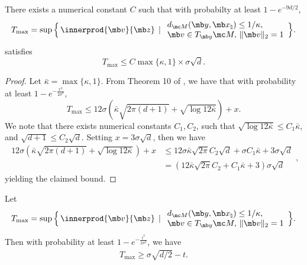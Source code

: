 




{
\begin{lemma}\label{lem:upper bound for Tmax} There exists a numerical constant $C$ such that with probabilty at least $1 - e^{-9d/2}$, 
    \begin{equation}
    T_{\max} = \sup \, \Bigl\{ \, \innerprod{ \mb v }{\mb z } \, \mid  \begin{array}{l} d_{\mc M}(\mb y, \mb x_\natural) \le 1/\kappa, \\ \mb v \in T_{\mb y} \mc M, \, \| \mb v \|_2 = 1 \end{array} \Bigr\}. 
\end{equation}
satisfies 
\begin{equation}
    T_{\max} 
    \leq C \max\{ \kappa, 1 \} \times \sigma \sqrt{d}.
\end{equation}
\end{lemma}

\begin{proof}
Let $\bar{\kappa} = \max \{ \kappa, 1 \}$. From Theorem 10 of \cite{yan2023tpopt}, we have that  with probability at least $1-e^{-\frac{x^{2}}{2\sigma^{2}}}$,  
\begin{equation}
    T_{\max} \le 12\sigma\left(\bar{\kappa} \sqrt{2\pi(d+1)}+\sqrt{\log12\bar{\kappa}}\right)+x. 
\end{equation}
We note that there exists numerical constants $C_1, C_2$, such that $\sqrt{\log 12\bar{\kappa}} \leq C_1 \bar{\kappa}$, and $\sqrt{d+1}\leq C_2 \sqrt{d}$. Setting $x = 3\sigma\sqrt{d}$, then we have
\begin{equation}
    \begin{aligned}                         
       12\sigma(\bar{\kappa}\sqrt{2\pi(d+1)}+\sqrt{\log12\bar{\kappa}})+x
        &\leq 12\sigma\bar{\kappa}\sqrt{2\pi} C_2 \sqrt{d} + \sigma C_1 \bar{\kappa} + 3\sigma\sqrt{d}\\
        &=\left( 12\bar{\kappa}\sqrt{2\pi} C_2 + C_1 \bar{\kappa} +3\right) \sigma \sqrt{d}
    \end{aligned},
\end{equation}
yielding the claimed bound. 

\end{proof}
}




{
\begin{lemma}\label{lem:lower bound for Tmax}
    Let
    \begin{equation}
    T_{\max} = \sup \, \Bigl\{ \, \innerprod{ \mb v }{\mb z } \, \mid  \begin{array}{l} d_{\mc M}(\mb y, \mb x_\natural) \le 1/\kappa, \\ \mb v \in T_{\mb y} \mc M, \, \| \mb v \|_2 = 1 \end{array} \Bigr\}. 
\end{equation}
Then with probability at least $1 - e^{-\frac{t^2}{2\sigma^2}}$, we have 
\begin{align}
    T_{\max} \ge \sigma \sqrt{d/2} - t. 
\end{align}
\end{lemma}
}

